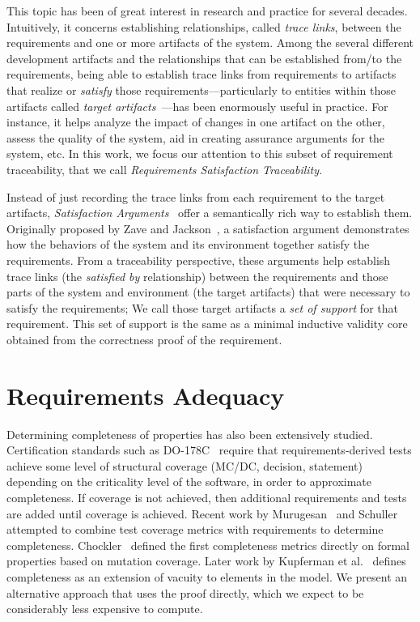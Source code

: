 This topic has been of great interest in research and practice for several decades. Intuitively, it concerns establishing relationships, called \emph{trace links}, between the requirements and one or more artifacts of the system.
Among the several different development artifacts and the relationships that can be established from/to the requirements, being able to establish trace links from requirements to artifacts that realize or \emph{satisfy} those requirements---particularly
to entities within those artifacts called \emph{target artifacts}~\cite{gotel2012traceability}---has been enormously useful in practice. For instance, it helps analyze the impact of changes in one artifact on the other, assess the quality of the system, aid in creating assurance arguments for the system, etc. In this work, we focus our attention to this subset of requirement traceability, that we call \emph{Requirements Satisfaction Traceability.}

Instead of just recording the trace links from each requirement to the target artifacts, \emph{Satisfaction Arguments}~\cite{zave1997four} offer a semantically rich way to establish them. Originally proposed by Zave and Jackson~\cite{zave1997four}, a satisfaction argument demonstrates how the behaviors of the system and its environment together satisfy the requirements. From a traceability perspective, these arguments help establish
 trace links (the \emph{satisfied by} relationship) between the requirements and those parts of the system and environment (the target artifacts) that were necessary to satisfy the requirements; We call those target artifacts a \emph{set of support} for that requirement. This set of support is the same as a minimal inductive validity core obtained from the correctness proof of the requirement.

\section{Requirements Adequacy}
Determining completeness of properties has also been extensively studied. Certification standards such as DO-178C~\cite{DO178C} require that requirements-derived tests achieve some level of structural coverage (MC/DC, decision, statement) depending on the criticality level of the software, in order to approximate completeness.  If coverage is not achieved, then additional requirements and tests are added until coverage is achieved. Recent work by Murugesan~\cite{murugesan2015we} and Schuller~\cite{schuler_assessing_2011} attempted to combine test coverage metrics with requirements to determine completeness.  Chockler~\cite{chockler_coverage_2003} defined the first completeness metrics directly on formal properties based on mutation coverage.  Later work by Kupferman et al.~\cite{Kupferman:2006:SCF} defines completeness as an extension of vacuity to elements in the model.  We present an alternative approach that uses the proof directly, which we expect to be considerably less expensive to compute.


